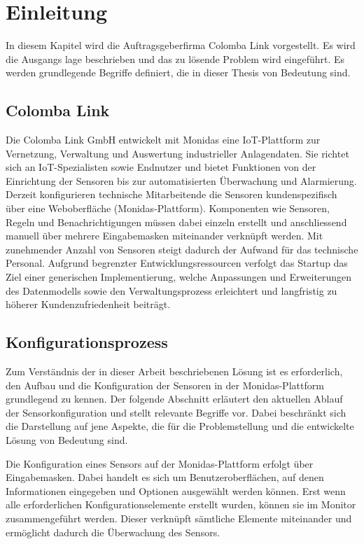 \section{Einleitung}
 In diesem Kapitel wird die Auftragsgeberfirma Colomba Link vorgestellt. Es wird die Ausgangs
lage beschrieben und das zu lösende Problem wird eingeführt. Es werden grundlegende Begriffe
 definiert, die in dieser Thesis von Bedeutung sind.

\subsection{Colomba Link}

Die Colomba Link GmbH entwickelt mit Monidas eine IoT-Plattform zur Vernetzung, Verwaltung und Auswertung industrieller Anlagendaten. Sie richtet sich an IoT-Spezialisten sowie Endnutzer und bietet Funktionen von der Einrichtung der Sensoren bis zur automatisierten Überwachung und Alarmierung. Derzeit konfigurieren technische Mitarbeitende die Sensoren kundenspezifisch über eine Weboberfläche (Monidas-Plattform). Komponenten wie Sensoren, Regeln und Benachrichtigungen müssen dabei einzeln erstellt und anschliessend manuell über mehrere Eingabemasken miteinander verknüpft werden. Mit zunehmender Anzahl von Sensoren steigt dadurch der Aufwand für das technische Personal. Aufgrund begrenzter Entwicklungsressourcen verfolgt das Startup das Ziel einer generischen Implementierung, welche Anpassungen und Erweiterungen des Datenmodells sowie den Verwaltungsprozess erleichtert und langfristig zu höherer Kundenzufriedenheit beiträgt. 

\subsection{Konfigurationsprozess}
Zum Verständnis der in dieser Arbeit beschriebenen Lösung ist es erforderlich, den Aufbau und die Konfiguration der Sensoren in der Monidas-Plattform grundlegend zu kennen. Der folgende Abschnitt erläutert den aktuellen Ablauf der Sensorkonfiguration und stellt relevante Begriffe vor. Dabei beschränkt sich die Darstellung auf jene Aspekte, die für die Problemstellung und die entwickelte Lösung von Bedeutung sind.

Die Konfiguration eines Sensors auf der Monidas-Plattform erfolgt über Eingabemasken. Dabei handelt es sich um Benutzeroberflächen, auf denen Informationen eingegeben und Optionen ausgewählt werden können. Erst wenn alle erforderlichen Konfigurationselemente erstellt wurden, können sie im Monitor zusammengeführt werden. Dieser verknüpft sämtliche Elemente miteinander und ermöglicht dadurch die Überwachung des Sensors.

